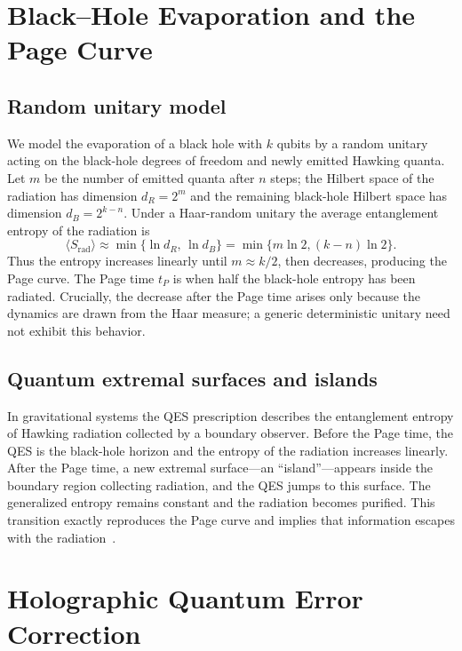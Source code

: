 \documentclass[12pt]{article}
\begin{document}
\section{Black–Hole Evaporation and the Page Curve}

\subsection{Random unitary model}
We model the evaporation of a black hole with $k$ qubits by a random unitary acting on the black-hole degrees of freedom and newly emitted Hawking quanta.  Let $m$ be the number of emitted quanta after $n$ steps; the Hilbert space of the radiation has dimension $d_R=2^m$ and the remaining black-hole Hilbert space has dimension $d_B=2^{k-n}$.  Under a Haar-random unitary the average entanglement entropy of the radiation is~\cite{Page:1993prl}
\begin{equation}
\langle S_\text{rad}\rangle \approx \min\big\{\ln d_R,\, \ln d_B\big\} = \min\{m\ln 2, (k-n)\ln 2\}.
\end{equation}
Thus the entropy increases linearly until $m \approx k/2$, then decreases, producing the Page curve.  The Page time $t_P$ is when half the black-hole entropy has been radiated.  Crucially, the decrease after the Page time arises only because the dynamics are drawn from the Haar measure; a generic deterministic unitary need not exhibit this behavior.

\subsection{Quantum extremal surfaces and islands}
In gravitational systems the QES prescription describes the entanglement entropy of Hawking radiation collected by a boundary observer.  Before the Page time, the QES is the black-hole horizon and the entropy of the radiation increases linearly.  After the Page time, a new extremal surface—an ``island''—appears inside the boundary region collecting radiation, and the QES jumps to this surface.  The generalized entropy remains constant and the radiation becomes purified.  This transition exactly reproduces the Page curve and implies that information escapes with the radiation~\cite{SciPost:2020islands}.

\section{Holographic Quantum Error Correction}
\end{document}
